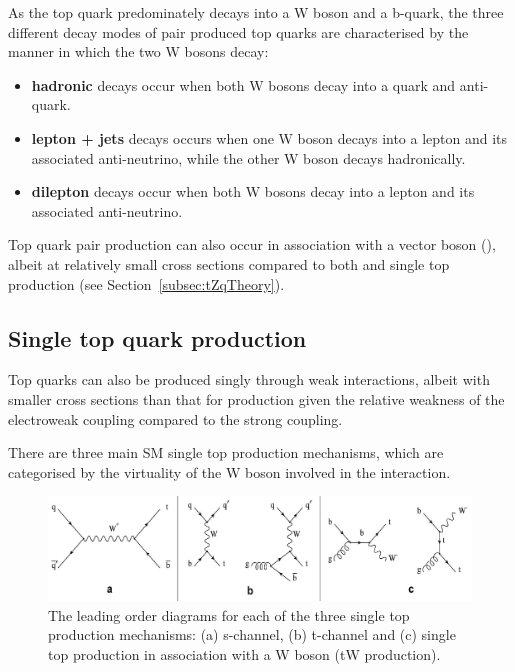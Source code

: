As the top quark predominately decays into a W boson and a b-quark, the three different decay modes of pair produced top quarks are characterised by the manner in which the two W bosons decay:
\begin{itemize}
\item \textbf{hadronic} decays occur when both W bosons decay into a quark and anti-quark.
\item \textbf{lepton + jets} decays occurs when one W boson decays into a lepton and its associated anti-neutrino, while the other W boson decays hadronically.
\item \textbf{dilepton} decays occur when both W bosons decay into a lepton and its associated anti-neutrino.
\end{itemize}
 

Top quark pair production can also occur in association with a vector boson (\ttV), albeit at relatively small cross sections compared to both \ttbar and single top production (see Section~\ref{subsec:tZqTheory}).

\subsection{Single top quark production}\label{subsec:singleTopTheory}
Top quarks can also be produced singly through weak interactions, albeit with smaller cross sections than that for \ttbar production given the relative weakness of the electroweak coupling compared to the strong coupling.

There are three main SM single top production mechanisms, which are categorised by the virtuality of the W boson involved in the interaction.

\begin{figure}[htbp]
\centering
\includegraphics[width=1.00\textwidth]{figs/top-physics/singletop_feyn.jpg}
\caption{The leading order diagrams for each of the three single top production mechanisms: (a) s-channel, (b) t-channel and (c) single top production in association with a W boson (tW production).}
\label{fig:singleTopDiagrams}
\end{figure}

